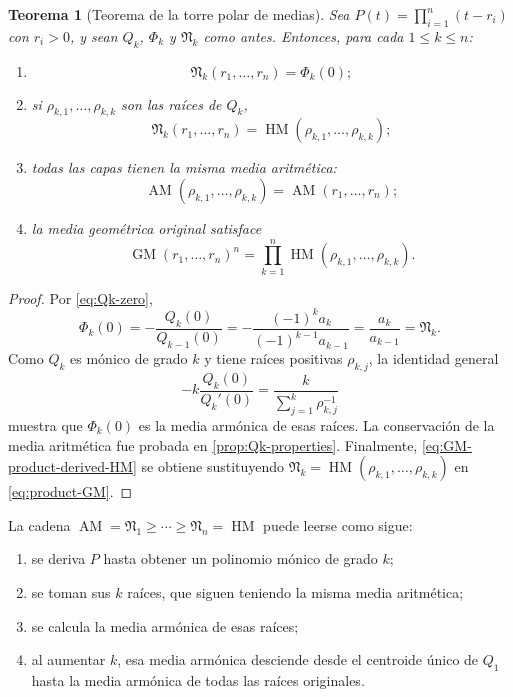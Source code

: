 \documentclass[11pt,oneside]{scrartcl}
\theoremstyle{plainblue}
\newtheorem{theorem}{Teorema}[section]
\theoremstyle{definitionblue}
\theoremstyle{remarkgray}
\newcommand{\AM}{\operatorname{AM}}
\newcommand{\GM}{\operatorname{GM}}
\newcommand{\HM}{\operatorname{HM}}
\newcommand{\cN}{\mathfrak{N}}
\begin{document}
\begin{theorem}[Teorema de la torre polar de medias]\label{thm:polar-tower-means}
Sea \(P(t)=\prod_{i=1}^{n}(t-r_i)\) con \(r_i>0\), y sean \(Q_k\), \(\Phi_k\) y
\(\cN_k\) como antes. Entonces, para cada \(1\le k\le n\):
\begin{enumerate}[label=\textup{(\roman*)}]
\item
\begin{equation}\label{eq:Nk-Phik0}
\boxed{\cN_k(r_1,\dots,r_n)=\Phi_k(0)};
\end{equation}
\item si \(\rho_{k,1},\dots,\rho_{k,k}\) son las raíces de \(Q_k\),
\begin{equation}\label{eq:Nk-HM-derived}
\boxed{
\cN_k(r_1,\dots,r_n)
=\HM(\rho_{k,1},\dots,\rho_{k,k})};
\end{equation}
\item todas las capas tienen la misma media aritmética:
\begin{equation}\label{eq:AM-preserved}
\AM(\rho_{k,1},\dots,\rho_{k,k})
=\AM(r_1,\dots,r_n);
\end{equation}
\item la media geométrica original satisface
\begin{equation}\label{eq:GM-product-derived-HM}
\boxed{
\GM(r_1,\dots,r_n)^n
=\prod_{k=1}^{n}\HM(\rho_{k,1},\dots,\rho_{k,k})}.
\end{equation}
\end{enumerate}
\end{theorem}

\begin{proof}
Por \cref{eq:Qk-zero},
\[
\Phi_k(0)=-\frac{Q_k(0)}{Q_{k-1}(0)}
=-\frac{(-1)^ka_k}{(-1)^{k-1}a_{k-1}}
=\frac{a_k}{a_{k-1}}=\cN_k.
\]
Como \(Q_k\) es mónico de grado \(k\) y tiene raíces positivas \(\rho_{k,j}\), la
identidad general
\[
-k\frac{Q_k(0)}{Q_k'(0)}
=\frac{k}{\sum_{j=1}^{k}\rho_{k,j}^{-1}}
\]
muestra que \(\Phi_k(0)\) es la media armónica de esas raíces. La conservación de la
media aritmética fue probada en \cref{prop:Qk-properties}. Finalmente,
\cref{eq:GM-product-derived-HM} se obtiene sustituyendo
\(\cN_k=\HM(\rho_{k,1},\dots,\rho_{k,k})\) en
\cref{eq:product-GM}.
\end{proof}

\begin{keybox}[Interpretación]
La cadena \(\AM=\cN_1\ge\cdots\ge\cN_n=\HM\) puede leerse como sigue:
\begin{enumerate}[leftmargin=8mm]
\item se deriva \(P\) hasta obtener un polinomio mónico de grado \(k\);
\item se toman sus \(k\) raíces, que siguen teniendo la misma media aritmética;
\item se calcula la media armónica de esas raíces;
\item al aumentar \(k\), esa media armónica desciende desde el centroide único de
\(Q_1\) hasta la media armónica de todas las raíces originales.
\end{enumerate}
\end{keybox}
\end{document}
